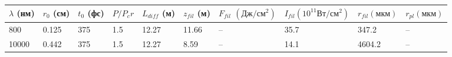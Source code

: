\documentclass[10pt,a4paper]{article}
\begin{document}
\begin{tabular}{|l|l|l|l|l|l|l|l|l|l|}
\hline
$\lambda$ (нм) & $r_0$ (см) & $t_0$ (фс) & $P/P_cr$ & $L_{diff}$ (м) & $z_{fil}$ (м) & $F_{fil}$ $(\textrm{Дж}/\textrm{см}^2)$ & $I_{fil} (10^{11} \textrm{Вт}/\textrm{см}^2)$ & $r_{fil} (\textrm{мкм})$ & $r_{pl} (\textrm{мкм})$ \\
\hline
800             & 0.125      & 375        & 1.5      & 12.27          & 11.66         & --                                        & 35.7                                            & 347.2                     & --                       \\
\hline
10000           & 0.442      & 375        & 1.5      & 12.27          & 8.59          & --                                        & 14.1                                            & 4604.2                    & --                       \\
\hline
\end{tabular}
\end{document}
